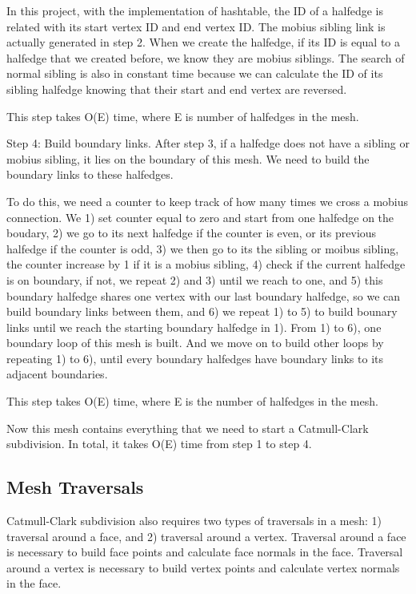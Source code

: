 \documentclass[12pt]{article}
\begin{document}
In this project, with the implementation of hashtable, the ID of a halfedge is related with its start vertex ID and end vertex ID. The mobius sibling link is actually generated in step 2. When we create the halfedge, if its ID is equal to a halfedge that we created before, we know they are mobius siblings. The search of normal sibling is also in constant time because we can calculate the ID of its sibling halfedge knowing that their start and end vertex are reversed. 

This step takes O(E) time, where E is number of halfedges in the mesh.

Step 4: Build boundary links. After step 3, if a halfedge does not have a sibling or mobius sibling, it lies on the boundary of this mesh. We need to build the boundary links to these halfedges.

To do this, we need a counter to keep track of how many times we cross a mobius connection. We 1) set counter equal to zero and start from one halfedge on the boudary, 2) we go to its next halfedge if the counter is even, or its previous halfedge if the counter is odd, 3) we then go to its the sibling or moibus sibling, the counter increase by 1 if it is a mobius sibling, 4) check if the current halfedge is on boundary, if not, we repeat 2) and 3) until we reach to one, and 5) this boundary halfedge shares one vertex with our last boundary halfedge, so we can build boundary links between them, and 6) we repeat 1) to 5) to build bounary links until we reach the starting boundary halfedge in 1). From 1) to 6), one boundary loop of this mesh is built. And we move on to build other loops by repeating 1) to 6), until every boundary halfedges have boundary links to its adjacent boundaries.

This step takes O(E) time, where E is the number of halfedges in the mesh.

Now this mesh contains everything that we need to start a Catmull-Clark subdivision. In total, it takes O(E) time from step 1 to step 4.


\subsection{Mesh Traversals} 
Catmull-Clark subdivision also requires two types of traversals in a mesh: 1) traversal around a face, and 2) traversal around a vertex. Traversal around a face is necessary to build face points and calculate face normals in the face. Traversal around a vertex is necessary to build vertex points and calculate vertex normals in the face.
\end{document}
